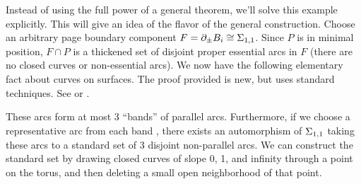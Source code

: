 Instead of using the full power of a general theorem, we'll solve this example
explicitly. This will give an idea of the flavor of the general construction.
Choose an arbitrary page boundary component $F=\partial_\pm B_i \cong \Sigma_{1,1}$.
Since $P$ is in minimal position, $F \cap P$ is a thickened set of disjoint
proper essential arcs in $F$ (there are no closed curves or non-essential
arcs).  We now have the following elementary fact about curves on surfaces.
The proof provided is new, but uses standard techniques. See \cite{FM} or
\cite{FLP}.

\begin{lemma}\label{L:ex1.1}

These arcs form at most 3 ``bands'' of parallel arcs. Furthermore, if we choose
a representative arc from each band , there exists an automorphism of
$\Sigma_{1,1}$ taking these arcs to a standard set of 3 disjoint non-parallel
arcs. We can construct the standard set by drawing closed curves of slope 0, 1,
and infinity through a point on the torus, and then deleting a small open
neighborhood of that point.

\end{lemma}
